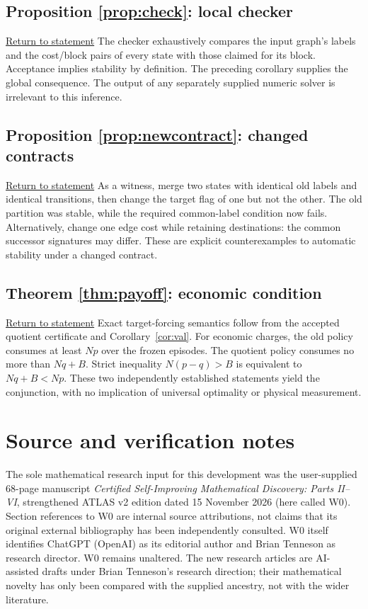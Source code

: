 \documentclass[11pt,letterpaper]{article}
\theoremstyle{definition}
\theoremstyle{remark}
\newcommand{\backstatement}[1]{\hyperlink{stmt:#1}{\footnotesize Return to statement}}
\begin{document}
\hypertarget{proof:check}{}\subsection*{Proposition \ref{prop:check}: local checker} \backstatement{check}
The checker exhaustively compares the input graph's labels and the cost/block pairs of every state with those claimed for its block. Acceptance implies stability by definition. The preceding corollary supplies the global consequence. The output of any separately supplied numeric solver is irrelevant to this inference.

\hypertarget{proof:newcontract}{}\subsection*{Proposition \ref{prop:newcontract}: changed contracts} \backstatement{newcontract}
As a witness, merge two states with identical old labels and identical transitions, then change the target flag of one but not the other. The old partition was stable, while the required common-label condition now fails. Alternatively, change one edge cost while retaining destinations: the common successor signatures may differ. These are explicit counterexamples to automatic stability under a changed contract.

\hypertarget{proof:payoff}{}\subsection*{Theorem \ref{thm:payoff}: economic condition} \backstatement{payoff}
Exact target-forcing semantics follow from the accepted quotient certificate and Corollary~\ref{cor:val}. For economic charges, the old policy consumes at least $Np$ over the frozen episodes. The quotient policy consumes no more than $Nq+B$. Strict inequality $N(p-q)>B$ is equivalent to $Nq+B<Np$. These two independently established statements yield the conjunction, with no implication of universal optimality or physical measurement.
\section*{Source and verification notes}
The sole mathematical research input for this development was the user-supplied 68-page manuscript \emph{Certified Self-Improving Mathematical Discovery: Parts II--VI}, strengthened ATLAS v2 edition dated 15 November 2026 (here called W0). Section references to W0 are internal source attributions, not claims that its original external bibliography has been independently consulted. W0 itself identifies ChatGPT (OpenAI) as its editorial author and Brian Tenneson as research director. W0 remains unaltered. The new research articles are AI-assisted drafts under Brian Tenneson's research direction; their mathematical novelty has only been compared with the supplied ancestry, not with the wider literature.
\end{document}
